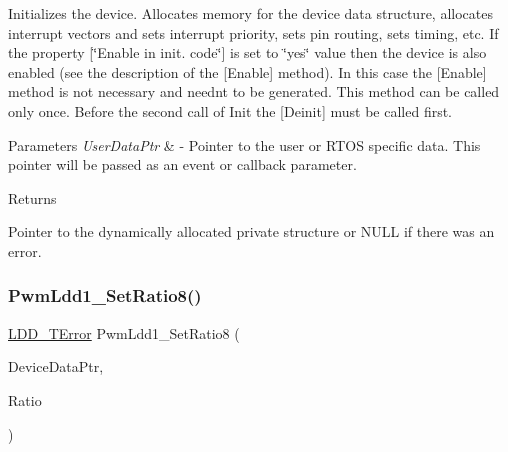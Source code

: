 Initializes the device. Allocates memory for the device data structure, allocates interrupt vectors and sets interrupt priority, sets pin routing, sets timing, etc. If the property \mbox{[}\char`\"{}\+Enable in init. code\char`\"{}\mbox{]} is set to \char`\"{}yes\char`\"{} value then the device is also enabled (see the description of the \mbox{[}Enable\mbox{]} method). In this case the \mbox{[}Enable\mbox{]} method is not necessary and needn\textquotesingle{}t to be generated. This method can be called only once. Before the second call of Init the \mbox{[}Deinit\mbox{]} must be called first. 


\begin{DoxyParams}{Parameters}
{\em User\+Data\+Ptr} & -\/ Pointer to the user or R\+T\+OS specific data. This pointer will be passed as an event or callback parameter. \\
\hline
\end{DoxyParams}
\begin{DoxyReturn}{Returns}

\begin{DoxyItemize}
\item Pointer to the dynamically allocated private structure or N\+U\+LL if there was an error. 
\end{DoxyItemize}
\end{DoxyReturn}
\mbox{\label{group___pwm_ldd1__module_gacc3364eaed4b107d6f9c1e5b0c4325ef}} 
\subsubsection{\texorpdfstring{Pwm\+Ldd1\+\_\+\+Set\+Ratio8()}{PwmLdd1\_SetRatio8()}}
{\footnotesize\ttfamily \hyperlink{group___p_e___types__module_ga24c2b045fd04e79e85f261ce4df35588}{L\+D\+D\+\_\+\+T\+Error} Pwm\+Ldd1\+\_\+\+Set\+Ratio8 (\begin{DoxyParamCaption}\item[{\hyperlink{group___p_e___types__module_gac5cf1362f1f0e3a2ce71b1bf2276d091}{L\+D\+D\+\_\+\+T\+Device\+Data} $\ast$}]{Device\+Data\+Ptr,  }\item[{uint8\+\_\+t}]{Ratio }\end{DoxyParamCaption})}



